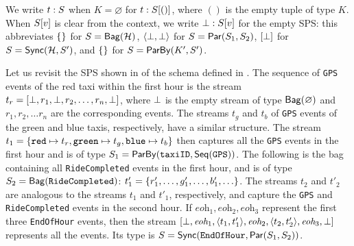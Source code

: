 


We write $t: \ss$ when $K = \varnothing$ for $t: \spstype{()}{\ss}$, where $()$ is the empty tuple of type $K$.
When $\spstype{v}{\ss}$ is clear from the context,
we write $\spsemp: \spstype{v}{\ss}$ for the empty SPS:
this abbreviates $\spsbag{}$ for $\ss = \relleaf{\mathcal{H}}$,
$\spspar{\spsemp}{\spsemp}$ for $\ss = \parcomp{S_1}{S_2}$,
$\spsseq{\bot}$ for $\ss = \hier{\mathcal{H}}{S'}$,
and $\spsbag{}$ for $\ss = \keyby{K'}{S'}$.

\newcommand{\eohevent}{\textit{eoh}}
\begin{example}
\label{45:ex:text-sps}
Let us revisit the SPS shown in  of the schema defined in .
The sequence of \texttt{GPS} events of the red taxi within the first hour is
the stream $t_r=[\spsemp,r_1,\spsemp,r_2,\ldots, r_n,\spsemp]$, where $\spsemp$ is the empty stream of type
$\relleaf{\varnothing}$
and $r_1, r_2, \ldots r_n$ are the corresponding events.
The streams $t_g$ and $t_b$ of \texttt{GPS} events of the green and blue taxis, respectively, have a similar structure.
The stream $t_1 = \spsbag{\keyed{\texttt{red}}{t_r},\keyed{\texttt{green}}{t_g},\keyed{\texttt{blue}}{t_b} }$ then captures all the \texttt{GPS} events in the first hour and is of type
$S_1 = \keyby{\texttt{taxiID}}{\seqleaf{\texttt{GPS}}}$.
The following is the bag containing
all \texttt{RideCompleted} events in the first hour,
and is of type $S_2 = \relleaf{\texttt{RideCompleted}}$:
$t'_1=\spsbag{r'_1,\ldots,g'_1,\ldots,b'_1,\ldots}$.
The streams $t_2$ and $t'_2$ are analogous to the streams $t_1$ and $t'_1$, respectively,
and capture the \texttt{GPS}  and \texttt{RideCompleted} events in the second hour.
If $\eohevent_1, \eohevent_2, \eohevent_3$ represent the first three \texttt{EndOfHour} events,
then the stream
$[\spsemp,\eohevent_1,\spspar{t_1}{t'_1},\eohevent_2,\spspar{t_2}{t'_2},\eohevent_3,\spsemp]$
represents all the events.
Its type is $S = \hier{\texttt{EndOfHour}}{\parcomp{S_1}{S_2}}$.
\end{example}

